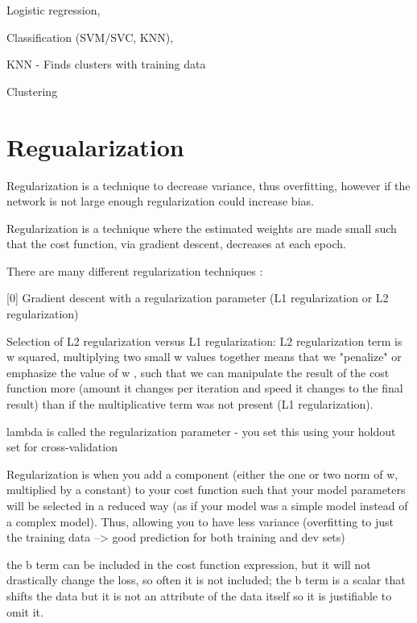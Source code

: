 \documentclass[11pt, onecolumn]{article}
\begin{document}
Logistic regression, 



Classification (SVM/SVC, KNN), 

KNN 
	- Finds clusters with training data




Clustering



\section{Regualarization}

Regularization is a technique to decrease variance, thus overfitting, however if the network is not large enough regularization could increase bias.

Regularization is a technique where the estimated weights are made small such that the cost function, via gradient descent, decreases at each epoch. 

There are many different regularization techniques :

[0] Gradient descent with a regularization parameter (L1 regularization or L2 regularization)

Selection of L2 regularization versus L1 regularization: L2 regularization term is w squared, multiplying two small w values together means that we "penalize" or emphasize the value of w , such that we can manipulate the result of the cost function more (amount it changes per iteration and speed it changes to the final result) than if the multiplicative term was not present (L1 regularization). 

lambda is called the regularization parameter - you set this using your holdout set for cross-validation

Regularization is when you add a component (either the one or two norm of w, multiplied by a constant) to your cost function such that your model parameters will be selected in a reduced way (as if your model was a simple model instead of a complex model).  Thus, allowing you to have less variance (overfitting to just the training data --> good prediction for both training and dev sets)

the b term can be included in the cost function expression, but it will not drastically change the loss, so often it is not included; the b term is a scalar that shifts the data but it is not an attribute of the data itself so it is justifiable to omit it.
\end{document}
